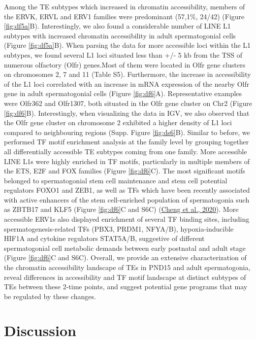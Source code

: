 \documentclass[12pt,twoside]{reedthesis}
\begin{document}
Among the TE subtypes which increased in chromatin accessibility,
members of the ERVK, ERVL and ERV1 families were predominant (57,1\%,
24/42) (Figure \ref{fig:df5a}B). Interestingly, we also found a considerable number of
LINE L1 subtypes with increased chromatin accessibility in adult
spermatogonial cells (Figure \ref{fig:df5a}B). When parsing the data for more
accessible loci within the L1 subtypes, we found several L1 loci
situated less than +/- 5 kb from the TSS of numerous olfactory (Olfr)
genes.Most of them were located in Olfr gene clusters on chromosomes 2,
7 and 11 (Table S5). Furthermore, the increase in accessibility of the
L1 loci correlated with an increase in mRNA expression of the nearby
Olfr gene in adult spermatogonial cells (Figure \ref{fig:df6}A). Representative
examples were Olfr362 and Olfr1307, both situated in the Olfr gene
cluster on Chr2 (Figure \ref{fig:df6}B). Interestingly, when visualizing the data in
IGV, we also observed that the Olfr gene cluster on chromosome 2
exhibited a higher density of L1 loci compared to neighbouring regions
(Supp. Figure \ref{fig:ds6}B). Similar to before, we performed TF motif enrichment analysis
at the family level by grouping together all differentially accessible
TE subtypes coming from one family. More accessible LINE L1s were highly
enriched in TF motifs, particularly in multiple members of the ETS, E2F
and FOX families (Figure \ref{fig:df6}C). The most significant motifs belonged to
spermatogonial stem cell maintenance and stem cell potential regulators
FOXO1 and ZEB1, as well as TFs which have been recently associated with
active enhancers of the stem cell-enriched population of spermatogonia
such as ZBTB17 and KLF5 (Figure \ref{fig:df6}C and S6C) (\protect\hyperlink{ref-cheng2020}{Cheng et al., 2020}). More accessible
ERV1s also displayed enrichment of several TF binding sites, including
spermatogenesis-related TFs (PBX3, PRDM1, NFYA/B), hypoxia-inducible
HIF1A and cytokine regulators STAT5A/B, suggestive of different
spermatogonial cell metabolic demands between early postnatal and adult
stage (Figure \ref{fig:df6}C and S6C). Overall, we provide an extensive
characterization of the chromatin accessibility landscape of TEs in
PND15 and adult spermatogonia, reveal differences in accessibility and
TF motif landscape at distinct subtypes of TEs between these 2-time
points, and suggest potential gene programs that may be regulated by
these changes.

\newpage

\hypertarget{discussion}{%
\section{Discussion}\label{discussion}}
\end{document}
